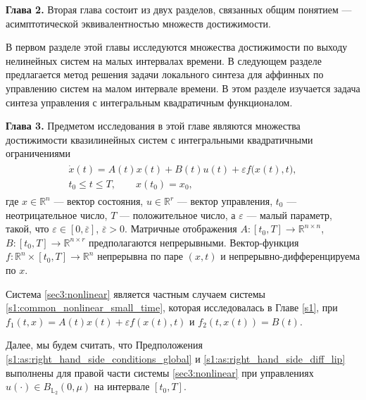 \documentclass[../abstract.tex]{subfiles}
\begin{document}
\textbf{Глава 2.}
Вторая глава состоит из двух разделов, связанных общим понятием --- асимптотической эквивалентностью множеств достижимости. 

В первом разделе этой главы исследуются множества достижимости по выходу нелинейных систем на малых интервалах времени.
В следующем разделе предлагается метод решения задачи локального синтеза для аффинных по управлению систем на малом интервале времени. 
В этом разделе изучается задача синтеза управления с интегральным квадратичным функционалом. 

\textbf{Глава 3.}
Предметом исследования в этой главе являются множества достижимости квазилинейных систем с интегральными квадратичными ограничениями
\begin{gather}\label{sec3:nonlinear}
	\begin{gathered}
	\dot{x}(t) = A(t)x(t)+B(t)u(t)+\varepsilon f\big(x(t),t\big), \\ t_0 \leqslant t \leqslant T, \qquad x(t_0) = x_0,
	\end{gathered}
\end{gather}
где $ x \in \mathbb{R}^n $ --- вектор состояния, $ u \in \mathbb{R}^r $ --- вектор управления, $t_0$ --- неотрицательное число, $T$ --- положительное число, а $\varepsilon$ --- малый параметр, такой, что $\varepsilon \in [0,\overline{\varepsilon}]$, $ \overline{\varepsilon} > 0$. 
Матричные отображения $A:[t_0,T] \to \mathbb{R}^{n\times n} $, $B: [t_0,T] \to \mathbb{R}^{n\times r} $ предполагаются непрерывными. 
Вектор-функция $f: \mathbb{R}^n \times [t_0,T] \to \mathbb{R}^n$ непрерывна по паре $(x, t)$ и непрерывно-дифференцируема по $x$.

Система \eqref{sec3:nonlinear} является частным случаем системы \eqref{s1:common_nonlinear_small_time}, которая исследовалась в Главе \ref{s1}, при $f_1(t,x) = A(t) x(t) + \varepsilon f(x(t),t)$ и $f_2(t, x(t)) = B(t)$.

Далее, мы будем считать, что Предположения \ref{s1:as:right_hand_side_conditions_global} и \ref{s1:as:right_hand_side_diff_lip} выполнены для правой части системы \eqref{sec3:nonlinear} при управлениях $ u(\cdot) \in B_{\mathbb{L}_2}(0,\mu) $ на интервале $ [t_0, T]$.
\end{document}
